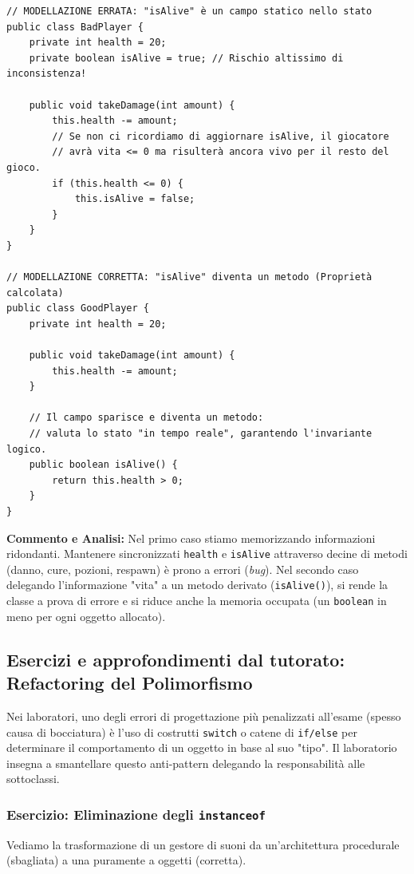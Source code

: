 \documentclass[12pt, a4paper]{article}
\begin{document}
\begin{verbatim}
// MODELLAZIONE ERRATA: "isAlive" è un campo statico nello stato
public class BadPlayer {
    private int health = 20;
    private boolean isAlive = true; // Rischio altissimo di inconsistenza!

    public void takeDamage(int amount) {
        this.health -= amount;
        // Se non ci ricordiamo di aggiornare isAlive, il giocatore
        // avrà vita <= 0 ma risulterà ancora vivo per il resto del gioco.
        if (this.health <= 0) {
            this.isAlive = false; 
        }
    }
}

// MODELLAZIONE CORRETTA: "isAlive" diventa un metodo (Proprietà calcolata)
public class GoodPlayer {
    private int health = 20;

    public void takeDamage(int amount) {
        this.health -= amount;
    }

    // Il campo sparisce e diventa un metodo: 
    // valuta lo stato "in tempo reale", garantendo l'invariante logico.
    public boolean isAlive() {
        return this.health > 0;
    }
}
\end{verbatim}

\textbf{Commento e Analisi:} Nel primo caso stiamo memorizzando informazioni ridondanti. Mantenere sincronizzati \texttt{health} e \texttt{isAlive} attraverso decine di metodi (danno, cure, pozioni, respawn) è prono a errori (\textit{bug}). Nel secondo caso delegando l'informazione "vita" a un metodo derivato (\texttt{isAlive()}), si rende la classe a prova di errore e si riduce anche la memoria occupata (un \texttt{boolean} in meno per ogni oggetto allocato).

\newpage

\subsection{Esercizi e approfondimenti dal tutorato: Refactoring del Polimorfismo}
Nei laboratori, uno degli errori di progettazione più penalizzati all'esame (spesso causa di bocciatura) è l'uso di costrutti \texttt{switch} o catene di \texttt{if/else} per determinare il comportamento di un oggetto in base al suo "tipo". Il laboratorio insegna a smantellare questo anti-pattern delegando la responsabilità alle sottoclassi.

\subsubsection{Esercizio: Eliminazione degli \texttt{instanceof}}
Vediamo la trasformazione di un gestore di suoni da un'architettura procedurale (sbagliata) a una puramente a oggetti (corretta).
\end{document}
